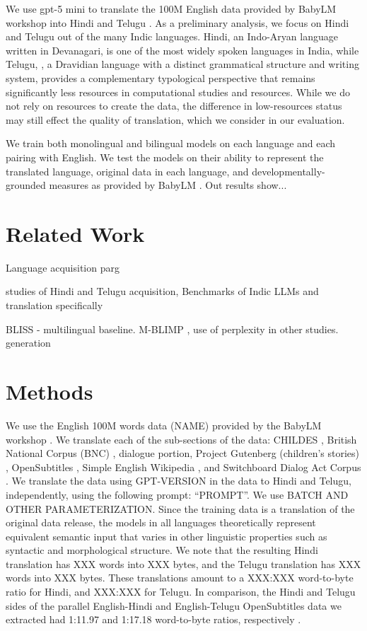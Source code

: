 \documentclass[11pt]{article}
\begin{document}
We use gpt-5 mini to translate the 100M English data provided by BabyLM workshop into Hindi and Telugu \cite{charpentier2025babylm}. As a preliminary analysis, we focus on Hindi and Telugu out of the many Indic languages. Hindi, an Indo-Aryan language  written in Devanagari, is one of the most widely spoken languages in India, while Telugu, , a Dravidian language with a distinct grammatical structure and writing system, provides a complementary typological perspective that remains significantly less resources in computational studies and resources. While we do not rely on resources to create the data, the difference in low-resources status may still effect the quality of translation, which we consider in our evaluation.

We train both monolingual and bilingual models on each language and each pairing with English. We test the models on their ability to represent the translated language, original data in each language, and developmentally-grounded measures as provided by BabyLM \cite{choshen2026babylm}. Out results show...


\section{Related Work}

Language acquisition parg



studies of Hindi and Telugu acquisition, Benchmarks of Indic LLMs and translation specifically

BLISS - multilingual baseline. M-BLIMP , use of perplexity in other studies. \cite{tampier2025recombitext} generation

\section{Methods}

We use the English 100M words data (NAME) provided by the BabyLM workshop \cite{choshen2026babylm}. We translate each of the sub-sections of the data: CHILDES \cite{macwhinney2000childes}, British National Corpus (BNC) \cite{bnc2007}, dialogue portion, Project Gutenberg (children’s stories) \cite{gerlach2020standardized}, OpenSubtitles \cite{lison-tiedemann-2016-opensubtitles2016}, Simple English Wikipedia \cite{simplewiki2023}, and Switchboard Dialog Act Corpus \cite{stolcke2000dialogue}. We translate the data using GPT-VERSION in the data to Hindi and Telugu, independently, using the following prompt: ``PROMPT''. We use BATCH AND OTHER PARAMETERIZATION. Since the training data is a translation of the original data release, the models in all languages theoretically represent equivalent semantic input that varies in other linguistic properties such as syntactic and morphological structure. We note that the resulting Hindi translation has XXX words into XXX bytes, and the Telugu translation has XXX words into XXX bytes. These translations amount to a XXX:XXX word-to-byte ratio for Hindi, and XXX:XXX for Telugu. In comparison, the Hindi and Telugu sides of the parallel English-Hindi and English-Telugu OpenSubtitles data we extracted had 1:11.97 and 1:17.18 word-to-byte ratios, respectively \citep{lison-tiedemann-2016-opensubtitles2016}.
\end{document}
